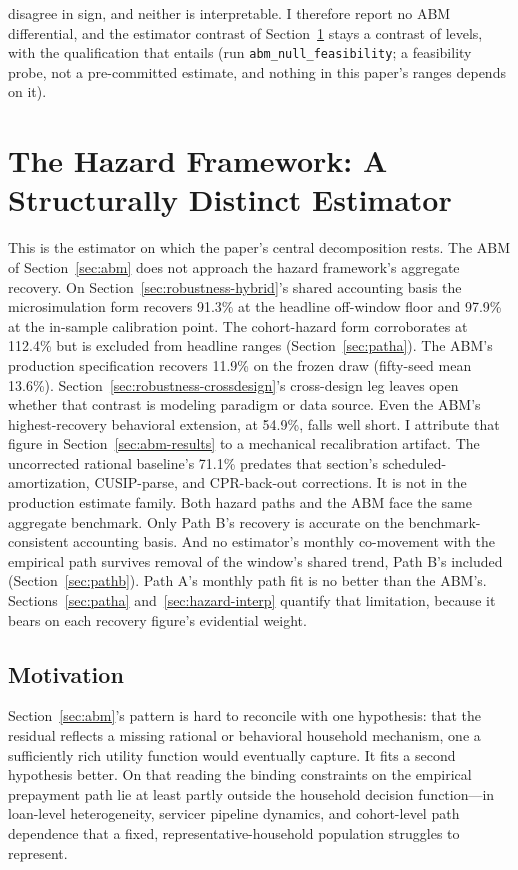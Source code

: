 \documentclass[12pt]{article}
\begin{document}
disagree in sign, and neither is interpretable. I therefore report no ABM differential, and the estimator contrast of Section~\ref{sec:hazard} stays a contrast of levels, with the qualification that entails (run \texttt{abm\_null\_feasibility}; a feasibility probe, not a pre-committed estimate, and nothing in this paper's ranges depends on it).
\section{The Hazard Framework: A Structurally Distinct Estimator}\label{sec:hazard}

This is the estimator on which the paper's central decomposition rests. The ABM of Section~\ref{sec:abm} does not approach the hazard framework's aggregate recovery. On Section~\ref{sec:robustness-hybrid}'s shared accounting basis the microsimulation form recovers 91.3\% at the headline off-window floor and 97.9\% at the in-sample calibration point. The cohort-hazard form corroborates at 112.4\% but is excluded from headline ranges (Section~\ref{sec:patha}). The ABM's production specification recovers 11.9\% on the frozen draw (fifty-seed mean 13.6\%). Section~\ref{sec:robustness-crossdesign}'s cross-design leg leaves open whether that contrast is modeling paradigm or data source. Even the ABM's highest-recovery behavioral extension, at 54.9\%, falls well short. I attribute that figure in Section~\ref{sec:abm-results} to a mechanical recalibration artifact. The uncorrected rational baseline's 71.1\% predates that section's scheduled-amortization, CUSIP-parse, and CPR-back-out corrections. It is not in the production estimate family. Both hazard paths and the ABM face the same aggregate benchmark. Only Path B's recovery is accurate on the benchmark-consistent accounting basis. And no estimator's monthly co-movement with the empirical path survives removal of the window's shared trend, Path B's included (Section~\ref{sec:pathb}). Path A's monthly path fit is no better than the ABM's. Sections~\ref{sec:patha} and~\ref{sec:hazard-interp} quantify that limitation, because it bears on each recovery figure's evidential weight.

\subsection{Motivation}\label{sec:hazard-motivation}

Section~\ref{sec:abm}'s pattern is hard to reconcile with one hypothesis: that the residual reflects a missing rational or behavioral household mechanism, one a sufficiently rich utility function would eventually capture. It fits a second hypothesis better. On that reading the binding constraints on the empirical prepayment path lie at least partly outside the household decision function---in loan-level heterogeneity, servicer pipeline dynamics, and cohort-level path dependence that a fixed, representative-household population struggles to represent.
\end{document}
